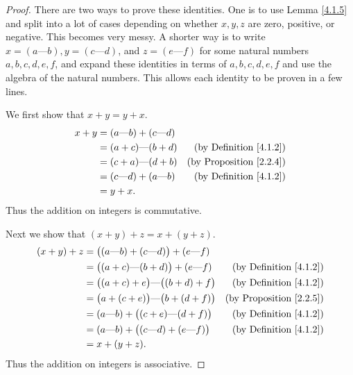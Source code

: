 \begin{proof}
    There are two ways to prove these identities.
    One is to use Lemma \ref{4.1.5} and split into a lot of cases depending on whether \(x, y, z\) are zero, positive, or negative.
    This becomes very messy.
    A shorter way is to write \(x = (a \text{---} b), y = (c \text{---} d)\), and \(z = (e \text{---} f)\) for some natural numbers \(a, b, c, d, e, f\), and expand these identities in terms of \(a, b, c, d, e, f\) and use the algebra of the natural numbers.
    This allows each identity to be proven in a few lines.

    We first show that \(x + y = y + x\).
    \begin{align*}
        x + y & = (a \text{---} b) + (c \text{---} d) &                                     \\
              & = (a + c) \text{---} (b + d)          & \text{(by Definition \ref{4.1.2})}  \\
              & = (c + a) \text{---} (d + b)          & \text{(by Proposition \ref{2.2.4})} \\
              & = (c \text{---} d) + (a \text{---} b) & \text{(by Definition \ref{4.1.2})}  \\
              & = y + x.
    \end{align*}
    Thus the addition on integers is commutative.

    Next we show that \((x + y) + z = x + (y + z)\).
    \begin{align*}
        (x + y) + z & = \big((a \text{---} b) + (c \text{---} d)\big) + (e \text{---} f)                                       \\
                    & = \big((a + c) \text{---} (b + d)\big) + (e \text{---} f)          & \text{(by Definition \ref{4.1.2})}  \\
                    & = \big((a + c) + e\big) \text{---} \big((b + d) + f\big)           & \text{(by Definition \ref{4.1.2})}  \\
                    & = \big(a + (c + e)\big) \text{---} \big(b + (d + f)\big)           & \text{(by Proposition \ref{2.2.5})} \\
                    & = (a \text{---} b) + \big((c + e) \text{---} (d + f)\big)          & \text{(by Definition \ref{4.1.2})}  \\
                    & = (a \text{---} b) + \big((c \text{---} d) + (e \text{---} f)\big) & \text{(by Definition \ref{4.1.2})}  \\
                    & = x + (y + z).
    \end{align*}
    Thus the addition on integers is associative.


\end{proof}
